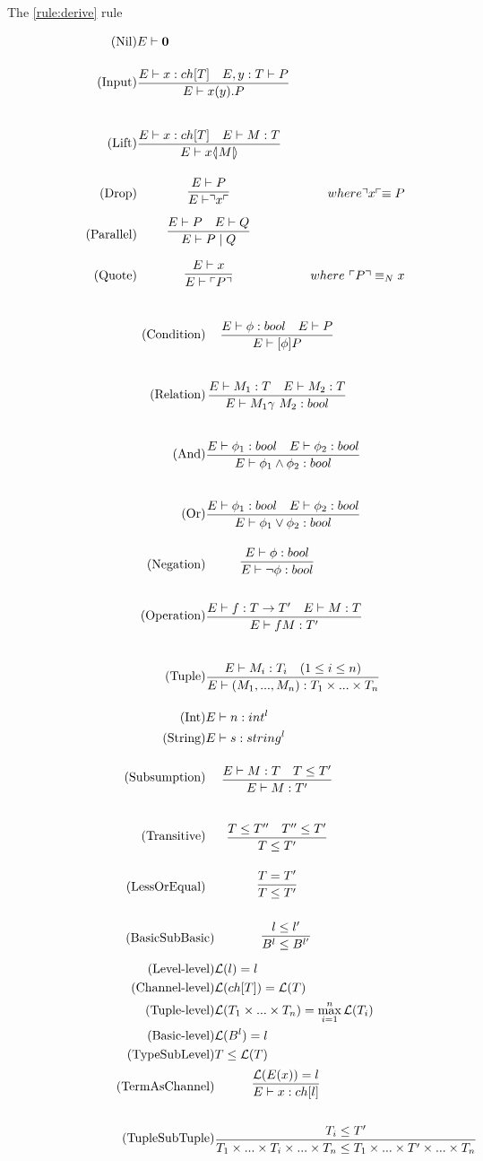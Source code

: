 The \ref{rule:derive} rule 

\begin{align}
\tag{Nil} &E \vdash \nil\\
\tag{Input} &\infrule{E\vdash x:ch[T]\quad E,y:T\vdash P}{E \vdash \inp{x}{y}P}\\
\tag{Lift} &\infrule{E\vdash x:ch[T]\quad E \vdash M:T}{E\vdash \lift{x}{M}}\\
\tag{Drop} &\infrule{E \vdash P}{E\vdash \drop{x}}& where \drop{x} \equiv P\\
\tag{Parallel} &\infrule{E\vdash P \quad E \vdash Q}{E \vdash P \para Q}\\
\tag{Quote} &\infrule{E \vdash x}{E\vdash \quot{P}}& where\ \quot{P} \equiv_N x
\end{align}

\begin{align}
\tag{Condition} &\infrule{E\vdash \phi:bool\quad E\vdash P}{E \vdash [\phi] P}\\
\tag{Relation} &\infrule{E\vdash M_1:T \quad E\vdash M_2:T}{E\vdash M_1 \gamma\ M_2:bool}\\
\tag{And} &\infrule{E\vdash \phi _1:bool \quad E\vdash \phi _2:bool}{E\vdash \phi _1 \land \phi _2:bool}\\
\tag{Or} &\infrule{E\vdash \phi _1:bool \quad E\vdash \phi _2:bool}{E\vdash \phi _1 \lor \phi _2:bool}\\
\tag{Negation} &\infrule{E\vdash \phi :bool }{E\vdash \neg \phi :bool}\\
\tag{Operation} &\infrule{E\vdash f:T\ra T'\quad E\vdash M:T}{E\vdash fM:T'}\\
\tag{Tuple} &\infrule{E\vdash M_i:T_i \quad (1\leq i\leq n)}{E\vdash (M_1,...,M_n):T_1\times...\times T_n}\\
\tag{Int} &E\vdash n: int^l\\
\tag{String} &E\vdash s:string^l\\
\tag{Subsumption} &\infrule{E\vdash M:T\quad T\leq T'}{E\vdash M:T'}\\
\tag{Transitive} &\infrule{T\leq T''\quad T''\leq T'}{T\leq T'}\\
\tag{LessOrEqual} &\infrule{T=T'}{T\leq T'}
\end{align}

\begin{align}
\tag{BasicSubBasic} &\infrule{l\leq l'}{B^l\leq B^{l'}}\\
\tag{Level-level} &\level{l}=l\\
\tag{Channel-level} &\level{ch[T]} = \level{T}\\
\tag{Tuple-level} &\level{T_1\times...\times T_n}=\max_{i=1}^{n}{\level{T_i}}\\
\tag{Basic-level} &\level{B^l}=l\\
\tag{TypeSubLevel} &T\leq \level{T}\\
\tag{TermAsChannel} &\infrule{\level{E(x)}=l}{E\vdash x:ch[l]}\\
\tag{TupleSubTuple} &\infrule{T_i\leq T'}{T_1\times...\times T_i\times...\times T_n\leq T_1\times...\times T'\times...\times T_n}
\end{align}

